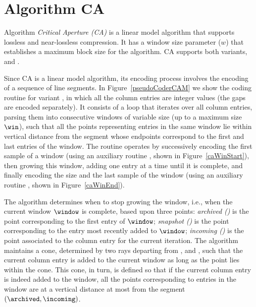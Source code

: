 
\clearpage

\section{Algorithm CA}
\label{algo:ca}


Algorithm \textit{Critical Aperture (CA)} \cite{coder:ca} is a linear model algorithm that
supports lossless and near-lossless compression. It has a window size parameter ($w$) that establishes a maximum block size for the algorithm. CA supports both variants, \maskalgo and \NOmaskalgo.


Since CA is a linear model algorithm, its encoding process involves the encoding of a sequence of line segments. In Figure~\ref{pseudoCoderCAM} we show the coding routine for variant \maskalgo, in which all the column entries are integer values (the gaps are encoded separately). It consists of a loop that iterates over all column entries, parsing them into consecutive windows of variable size (up to a maximum size $\win$), such that all the points representing entries in the same window lie within vertical distance \maxerror from the segment whose endpoints correspond to the first and last entries of the window. The routine operates by successively encoding the first sample of a window (using an auxiliary routine \CAWinStart, shown in Figure~\ref{caWinStart}), then growing this window, adding one entry at a time until it is complete, and finally encoding the size and the last sample of the window (using an auxiliary routine \CAWinEnd, shown in Figure~\ref{caWinEnd}).





\clearpage








The algorithm determines when to stop growing the window, i.e., when the current window $\window$ is complete, based upon three points: \textit{archived (\archived)} is the point corresponding to the first entry of $\window$; \textit{snapshot (\snapshot)} is the point corresponding to the entry most recently added to $\window$; \textit{incoming (\incoming)} is the point associated to the column entry for the current iteration. The algorithm maintains a cone, determined by two rays departing from \archived, \smin and \smax, such that the current column entry is added to the current window as long as the point \incoming lies within the cone. This cone, in turn, is defined so that if the current column entry is indeed added to the window, all the points corresponding to entries in the window are at a vertical distance at most \maxerror from the segment $(\archived, \incoming)$.


